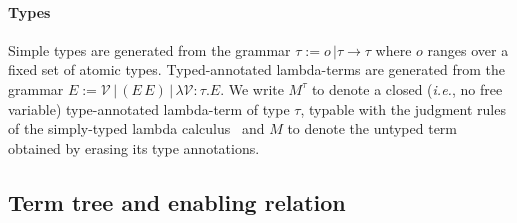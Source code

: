 \documentclass{elsarticle}
\makeatletter
\theoremstyle{plain}
\theoremstyle{definition}
\newcommand\VarSet{\mathcal{V}}
\renewcommand\ie{{\it i.e.\@\xspace}}
\makeatother
\begin{document}
\paragraph{Types} Simple types are generated from the grammar $\tau := o\, | \tau \rightarrow \tau$ where $o$ ranges over a fixed set of atomic types. Typed-annotated lambda-terms are generated from the grammar $E := \VarSet\, |\, (E\, E)\, |\, \lambda \VarSet \colon\tau. E $.
We write $M^\tau$ to denote a closed (\ie, no free variable)
type-annotated lambda-term of type $\tau$, typable with the judgment rules of the simply-typed lambda calculus~\cite{Barendregt84} and $M$ to denote the untyped term obtained by erasing its type annotations.

\subsection{Term tree and enabling relation}
\end{document}
